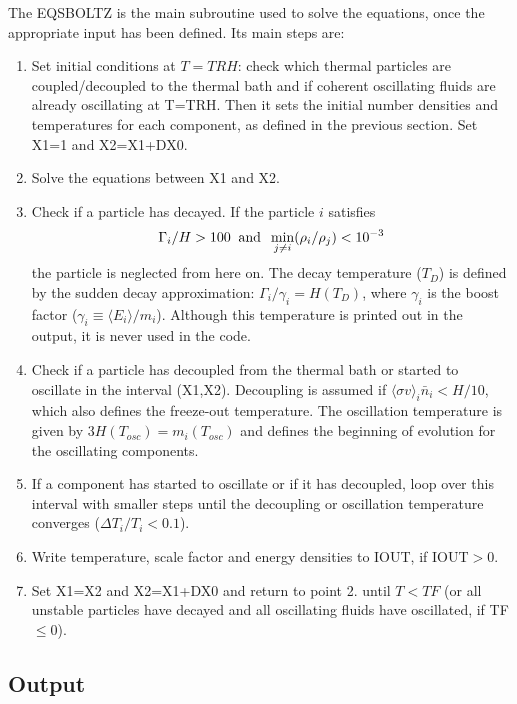 \documentclass[preprint,notoc]{JHEP3}
\def\sigv{\langle \sigma v \rangle}
\begin{document}
The EQSBOLTZ is the main subroutine used to solve the equations, once the appropriate input has been defined. Its main steps
are:
\begin{enumerate}
\item Set initial conditions at $T=TRH$: check which thermal particles are coupled/decoupled to the thermal bath and if coherent
oscillating fluids are already oscillating at T=TRH. Then it sets the initial
number densities and temperatures for each component, as defined in the previous section. Set X1=1 and X2=X1+DX0.
\item Solve the equations between X1 and X2.
\item Check if a particle has decayed. If the particle $i$ satisfies
\begin{equation}
\Gamma_i/H > 100\;\; {\rm and}\;\; \min_{j \neq i}(\rho_i/\rho_j)< 10^{-3}
\end{equation}
the particle is neglected from here on. 
The decay temperature ($T_D$) is defined by the sudden decay approximation: $\Gamma_i/\gamma_i = H(T_D)$, where $\gamma_i$ is
the boost factor ($\gamma_i \equiv \langle E_i \rangle/m_i$). Although this temperature
is printed out in the output, it is never used in the code.
\item Check if a particle has decoupled from the thermal bath or started to oscillate in the interval (X1,X2).
Decoupling is assumed if $\sigv_i \bar{n}_i < H/10$, which also defines the freeze-out temperature.
The oscillation temperature is given by $3 H(T_{osc}) = m_i(T_{osc})$ and defines the beginning of evolution for
the oscillating components.
\item If a component has started to oscillate or if it has decoupled, loop over this interval with smaller steps until the decoupling or oscillation temperature converges ($\Delta T_i/T_i < 0.1$).
\item Write temperature, scale factor and energy densities to IOUT, if IOUT$>0$.
\item Set X1=X2 and X2=X1+DX0 and return to point 2. until $T<TF$ (or all unstable particles have decayed and all oscillating
fluids have oscillated, if TF$\leq 0$).
\end{enumerate}




\subsection{Output}
\label{sec:Out}
\end{document}

